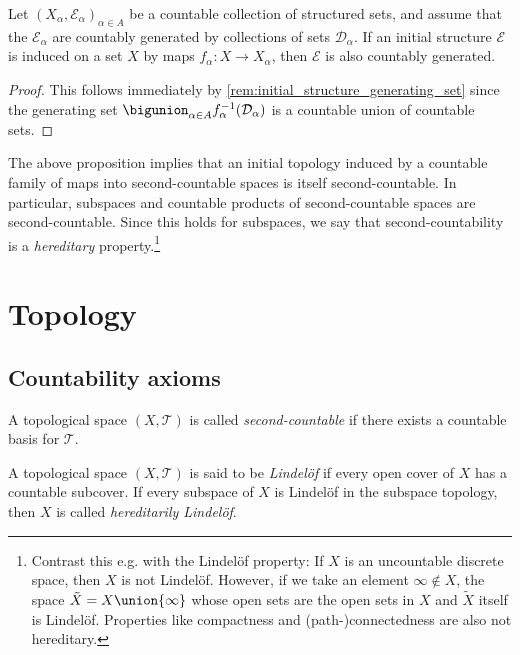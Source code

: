 \documentclass[article, a4paper, 11pt, oneside]{memoir}
\numberwithin{equation}{chapter}
\newcommand{\calT}{\mathcal{T}}
\newcommand{\calE}{\mathcal{E}}
\newcommand{\calD}{\mathcal{D}}
\begin{document}
\begin{proposition}
    Let $(X_\alpha,\calE_\alpha)_{\alpha \in A}$ be a countable collection of structured sets, and assume that the $\calE_\alpha$ are countably generated by collections of sets $\calD_\alpha$. If an initial structure $\calE$ is induced on a set $X$ by maps $f_\alpha \colon X \to X_\alpha$, then $\calE$ is also countably generated.
\end{proposition}

\begin{proof}
    This follows immediately by \cref{rem:initial_structure_generating_set} since the generating set $\bigunion_{\alpha \in A} f_\alpha^{-1}(\calD_\alpha)$ is a countable union of countable sets.
\end{proof}


\begin{examplebreak}
    The above proposition implies that an initial topology induced by a countable family of maps into second-countable spaces is itself second-countable. In particular, subspaces and countable products of second-countable spaces are second-countable. Since this holds for subspaces, we say that second-countability is a \emph{hereditary} property.\footnote{Contrast this e.g. with the Lindelöf property: If $X$ is an uncountable discrete space, then $X$ is not Lindelöf. However, if we take an element $\infty \not\in X$, the space $\tilde X = X \union \{\infty\}$ whose open sets are the open sets in $X$ and $\tilde X$ itself is Lindelöf. Properties like compactness and (path-)connectedness are also not hereditary.}
\end{examplebreak}



\chapter{Topology}

\section{Countability axioms}

\begin{definition}
    A topological space $(X, \calT)$ is called \emph{second-countable} if there exists a countable basis for $\calT$.
\end{definition}


\begin{definition}
    A topological space $(X, \calT)$ is said to be \emph{Lindelöf} if every open cover of $X$ has a countable subcover. If every subspace of $X$ is Lindelöf in the subspace topology, then $X$ is called \emph{hereditarily Lindelöf}.
\end{definition}
\end{document}
